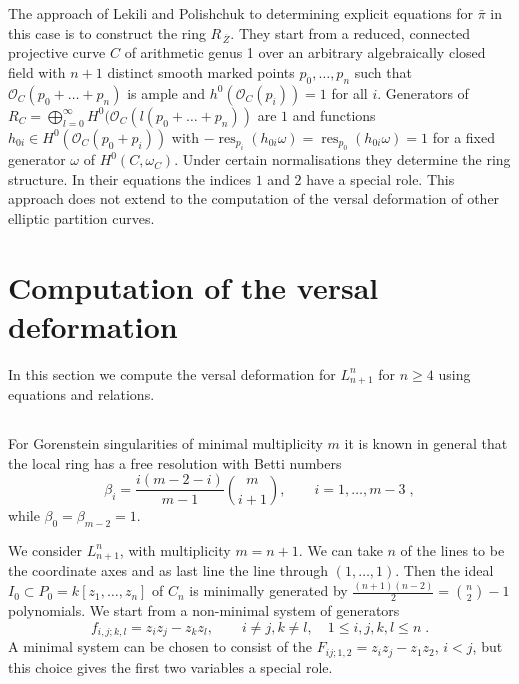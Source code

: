 \documentclass[12pt,a4paper]{amsart}  %
\DeclareMathOperator{\res}{res}
\newcommand{\olsi}[1]{\,\overline{\!{#1}}}
\theoremstyle{definition}
\theoremstyle{remark}
\begin{document}
The approach of Lekili  and Polishchuk \cite{LP} to determining explicit equations for $\bar{\pi}$ 
in this case is to construct the ring $R_{\olsi Z}$. They start from 
 a reduced, connected projective curve $C$ of arithmetic genus 1 over an arbitrary 
 algebraically closed field 
with $n+1$ distinct smooth marked points $p_0,\dots,p_n$ such that 
$\mathcal O_C(p_0+\dots+p_n)$ is ample and $h^0(\mathcal O_C(p_i))=1$ for all $i$.
Generators of $R_C=\bigoplus_{l=0}^\infty H^0(\mathcal O_{C}(l(p_0+\dots+p_n))$
are $1$ and functions $h_{0i}\in H^0(\mathcal O_{C}(p_0+p_i))$ with 
$-\res_{p_i}(h_{0i}\omega)=\res_{p_0}(h_{0i}\omega)=1$ for a fixed generator $\omega$ of
$H^0(C,\omega_C)$.  Under certain normalisations they determine the ring structure.
In their equations the indices $1$ and $2$ have a special role.
This approach does not extend to the computation of the versal deformation of other 
elliptic partition curves.


\section{Computation of the versal deformation}
In this section we compute the versal deformation for $L_{n+1}^n$ for $n\geq 4$
using equations and relations.

\subsection{}
For Gorenstein singularities of minimal multiplicity $m$ it is known \cite{Wa}
in general
that the local ring has a free resolution with Betti numbers
\[
\beta_i = \frac{i(m-2-i)}{m-1} \binom{m}{i+1},
\qquad i=1,\dots,m-3\;,
\]
while $\beta_0= \beta_{m-2}=1$. 


We consider $L_{n+1}^n$, with multiplicity $m=n+1$.
We can take $n$ of the lines to be the coordinate axes and as last line the
line through $(1,\dots,1)$. Then the ideal $I_0\subset P_0=k[z_1,\dots,z_n]$
of $C_n$ is minimally generated by $\frac{(n+1)(n-2)}2=\binom{n}2-1$ polynomials. 
We start from
a non-minimal system of generators
\[
f_{i,j;k,l} = z_iz_j-z_kz_l, \qquad i\neq j, k\neq l, \quad 1\leq i,j,k,l\leq n\;.
\]
A minimal system
can be chosen to consist  of the $F_{ij;1,2}=z_iz_j-z_1z_2$, $i<j$, 
but this choice gives the first two 
variables a special role.
\end{document}
